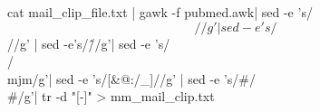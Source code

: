 
cat mail_clip_file.txt | gawk -f pubmed.awk| sed -e 's/\[//g'| sed -e 's/\]//g' | sed -e's/\^//g'| sed -e 's/\\/\\mjm/g'| sed -e 's/[&@:/_]//g' | sed -e 's/#/\\#/g'| tr -d "[-]"  > mm_mail_clip.txt

